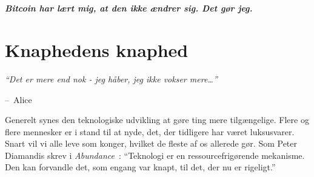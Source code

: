 \documentclass[paper=6in:9in,pagesize=pdftex,
               headinclude=on,footinclude=on,12pt]{scrbook}
\makeatletter
\newenvironment{chapquote}[2][4em]{\setlength{\@tempdima}{#1}%
   \def\chapquote@author{#2}%
   \parshape 1 \@tempdima \dimexpr\textwidth-2\@tempdima\relax%
   \itshape}{\par\normalfont\hfill--\ \chapquote@author\hspace*{\@tempdima}\par\bigskip}
\makeatother
\begin{document}
~\paragraph{Bitcoin har lært mig, at den ikke ændrer sig. Det gør jeg.}%
%
%
%
%
%
%
%
%
%

\chapter{Knaphedens knaphed}
\label{les:2}

\begin{chapquote}{Alice}
\enquote{Det er mere end nok - jeg håber, jeg ikke vokser mere\ldots}
\end{chapquote}

Generelt synes den teknologiske udvikling at gøre ting mere tilgængelige. Flere og flere mennesker er i stand til at nyde, det, der tidligere har været luksusvarer. Snart vil vi alle leve som konger, hvilket de fleste af os allerede gør. Som Peter Diamandis skrev i \textit{Abundance}~\cite{abundance}: \enquote{Teknologi er en ressourcefrigørende mekanisme. Den kan forvandle det, som engang var knapt, til det, der nu er rigeligt.}
\end{document}
